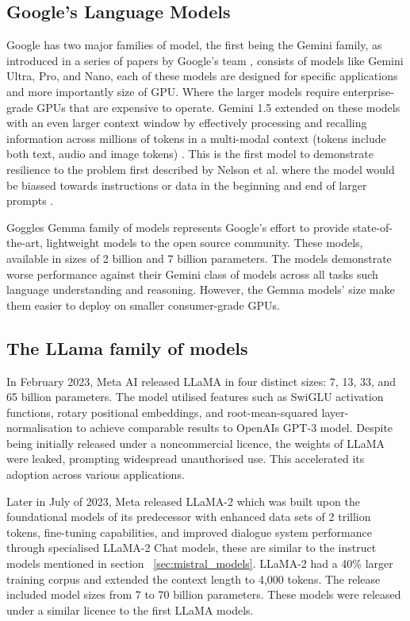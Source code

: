 \subsection{Google's Language Models}


Google has two major families of model, the first being the Gemini family, as introduced in a series of papers by Google's team \cite{gemini_team_gemini_2024-1}, consists of models like Gemini Ultra, Pro, and Nano, each of these models are designed for specific applications and more importantly size of GPU. Where the larger models require enterprise-grade GPUs that are expensive to operate. Gemini 1.5 extended on these models with an even larger context window by effectively processing and recalling information across millions of tokens in a multi-modal context (tokens include both text, audio and image tokens) \cite{gemini_team_gemini_2024}. This is the first model to demonstrate resilience to the problem first described by Nelson et al. where the model would be biassed towards instructions or data in the beginning and end of larger prompts \cite{liu_lost_2024}.


Goggles Gemma family of models \cite{gemma_team_gemma_2024} represents Google's effort to provide state-of-the-art, lightweight models to the open source community. These models, available in sizes of 2 billion and 7 billion parameters. The models demonstrate worse performance against their Gemini class of models across all tasks such language understanding and reasoning. However, the Gemma models’ size make them easier to deploy on smaller consumer-grade GPUs.


\subsection{The LLama family of models}


In February 2023, Meta AI released LLaMA \cite{touvron_llama_2023-1} in four distinct sizes: 7, 13, 33, and 65 billion parameters. The model utilised features such as SwiGLU activation functions, rotary positional embeddings, and root-mean-squared layer-normalisation to achieve comparable results to OpenAIs GPT-3 model. Despite being initially released under a noncommercial licence, the weights of LLaMA were leaked, prompting widespread unauthorised use. This accelerated its adoption across various applications.


Later in July of 2023, Meta released LLaMA-2 \cite{touvron_llama_2023-2} which was built upon the foundational models of its predecessor with enhanced data sets of 2 trillion tokens, fine-tuning capabilities, and improved dialogue system performance through specialised LLaMA-2 Chat models, these are similar to the instruct models mentioned in section ~\ref{sec:mistral_models}. LLaMA-2 had a 40\% larger training corpus and extended the context length to 4,000 tokens. The release included model sizes from 7 to 70 billion parameters. These models were released under a similar licence to the first LLaMA models.


